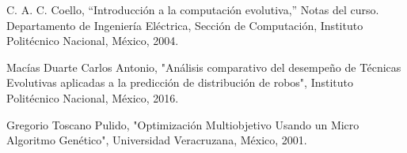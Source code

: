 \label{sec:bibliografia}
	
		C. A. C. Coello, “Introducción a la computación evolutiva,” Notas del curso. Departamento de Ingeniería Eléctrica, Sección de Computación, Instituto Politécnico Nacional, México, 2004.

		Macías Duarte Carlos Antonio, "Análisis comparativo del desempeño de Técnicas Evolutivas aplicadas a la predicción de distribución de robos", Instituto Politécnico Nacional, México, 2016.

		Gregorio Toscano Pulido, "Optimización Multiobjetivo Usando un Micro Algoritmo Genético", Universidad Veracruzana, México, 2001.